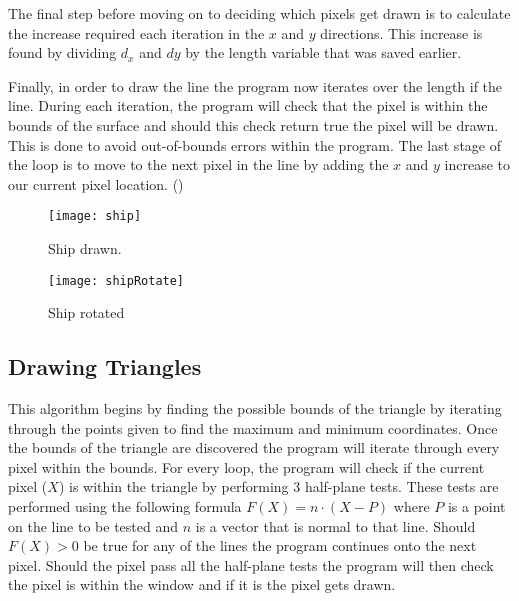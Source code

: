 \documentclass[
	a4paper, %
	10pt, %
]{CSUniSchoolLabReport}
\begin{document}
\begin{flushleft}
	The final step before moving on to deciding which pixels get drawn is to calculate
	the increase required each iteration in the \(x\) and \(y\) directions.
	This increase is found by dividing \(d_x\) and \(dy\) by the length variable that was
	saved earlier. 
\end{flushleft}

\begin{flushleft}
	Finally, in order to draw the line the program now iterates over the length if the line.
	During each iteration, the program will check that the pixel is within the bounds
	of the surface and should this check return true the pixel will be drawn. 
	This is done to avoid out-of-bounds errors within the program. The last stage
	of the loop is to move to the next pixel in the line by adding the \(x\) and \(y\) increase 
	to our current pixel location. (\cite{Kamble:2021})
\end{flushleft}



\begin{figure}[H]
	\centering
	\begin{minipage}[b]{0.4\textwidth}
		\texttt{[image: ship]}
		\caption{Ship drawn.}
	\end{minipage}
	\hfill
	\begin{minipage}[b]{0.4\textwidth}
		\texttt{[image: shipRotate]}
		\caption{Ship rotated}
  	\end{minipage}
\end{figure}

\subsection{Drawing Triangles}
\begin{flushleft}
	This algorithm begins by finding the possible bounds of the triangle by 
	iterating through the points given to find the maximum and minimum coordinates. 
	Once the bounds of the triangle are discovered the program will iterate 
	through every pixel within the bounds. For every loop, the program will check 
	if the current pixel (\(X\)) is within the triangle by performing 3 half-plane tests.
	These tests are performed using the following formula \(F(X)=n \cdot (X - P)\)
	where $P$ is a point on the line to be tested and $n$ is a vector that is normal to 
	that line. Should \(F(X) > 0\) be true for any of the lines the program continues onto 
	the next pixel. Should the pixel pass all the half-plane tests the program will 
	then check the pixel is within the window and if it is the pixel gets drawn. 

\end{flushleft}
\end{document}
